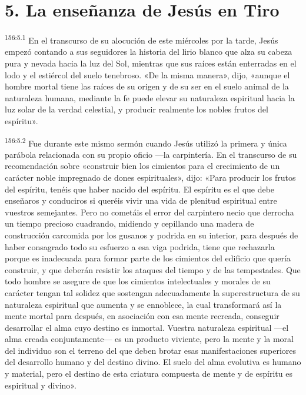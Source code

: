 \section*{5. La enseñanza de Jesús en Tiro}
\par 
\textsuperscript{156:5.1} En el transcurso de su alocución de este miércoles por la tarde, Jesús empezó contando a sus seguidores la historia del lirio blanco que alza su cabeza pura y nevada hacia la luz del Sol, mientras que sus raíces están enterradas en el lodo y el estiércol del suelo tenebroso. «De la misma manera», dijo, «aunque el hombre mortal tiene las raíces de su origen y de su ser en el suelo animal de la naturaleza humana, mediante la fe puede elevar su naturaleza espiritual hacia la luz solar de la verdad celestial, y producir realmente los nobles frutos del espíritu».

\par 
\textsuperscript{156:5.2} Fue durante este mismo sermón cuando Jesús utilizó la primera y única parábola relacionada con su propio oficio ---la carpintería. En el transcurso de su recomendación sobre «construir bien los cimientos para el crecimiento de un carácter noble impregnado de dones espirituales», dijo: «Para producir los frutos del espíritu, tenéis que haber nacido del espíritu. El espíritu es el que debe enseñaros y conduciros si queréis vivir una vida de plenitud espiritual entre vuestros semejantes. Pero no cometáis el error del carpintero necio que derrocha un tiempo precioso cuadrando, midiendo y cepillando una madera de construcción carcomida por los gusanos y podrida en su interior, para después de haber consagrado todo su esfuerzo a esa viga podrida, tiene que rechazarla porque es inadecuada para formar parte de los cimientos del edificio que quería construir, y que deberán resistir los ataques del tiempo y de las tempestades. Que todo hombre se asegure de que los cimientos intelectuales y morales de su carácter tengan tal solidez que sostengan adecuadamente la superestructura de su naturaleza espiritual que aumenta y se ennoblece, la cual transformará así la mente mortal para después, en asociación con esa mente recreada, conseguir desarrollar el alma cuyo destino es inmortal. Vuestra naturaleza espiritual ---el alma creada conjuntamente--- es un producto viviente, pero la mente y la moral del individuo son el terreno del que deben brotar esas manifestaciones superiores del desarrollo humano y del destino divino. El suelo del alma evolutiva es humano y material, pero el destino de esta criatura compuesta de mente y de espíritu es espiritual y divino».


